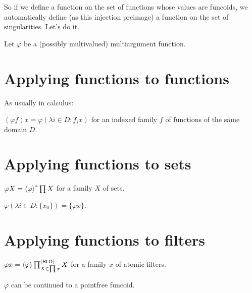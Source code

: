 So if we define a function on the set of functions whose values are funcoids, we automatically define (as this injection preimage) a function on the set of singularities. Let's do it.

Let $\varphi$ be a (possibly multivalued) multiargument function.

\section{Applying functions to functions}

As usually in calculus:

\begin{defn}
$(\varphi f) x = \varphi (\lambda i \in D : f_i x)$
for an indexed family $f$ of functions of the same domain $D$.
\end{defn}

\section{Applying functions to sets}

\begin{defn}
  $\varphi X = \left\langle \varphi\right\rangle ^{\ast} \prod X$ for a family $X$ of sets.
\end{defn}

\begin{obvious}
$\varphi (\lambda i \in D : \{ x_0 \}) = \{ \varphi x \}$.
\end{obvious}

\section{Applying functions to filters}

\begin{defn}
  $\varphi x = \left\langle \varphi\right\rangle \prod^{(\mathsf{RLD})}_{X \in \prod x} X$ for a
  family $x$ of atomic filters.
\end{defn}

\begin{prop}
  $\varphi$ can be continued to a pointfree funcoid.
\end{prop}

